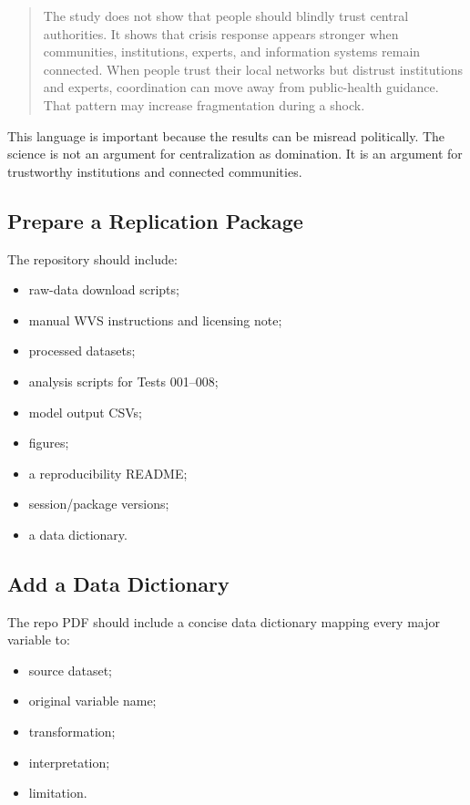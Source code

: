 \documentclass[12pt]{article}
\begin{document}
\begin{quote}
The study does not show that people should blindly trust central authorities. It shows that crisis response appears stronger when communities, institutions, experts, and information systems remain connected. When people trust their local networks but distrust institutions and experts, coordination can move away from public-health guidance. That pattern may increase fragmentation during a shock.
\end{quote}

This language is important because the results can be misread politically. The science is not an argument for centralization as domination. It is an argument for trustworthy institutions and connected communities.

\subsection{Prepare a Replication Package}

The repository should include:

\begin{itemize}
  \item raw-data download scripts;
  \item manual WVS instructions and licensing note;
  \item processed datasets;
  \item analysis scripts for Tests 001--008;
  \item model output CSVs;
  \item figures;
  \item a reproducibility README;
  \item session/package versions;
  \item a data dictionary.
\end{itemize}

\subsection{Add a Data Dictionary}

The repo PDF should include a concise data dictionary mapping every major variable to:

\begin{itemize}
  \item source dataset;
  \item original variable name;
  \item transformation;
  \item interpretation;
  \item limitation.
\end{itemize}
\end{document}
